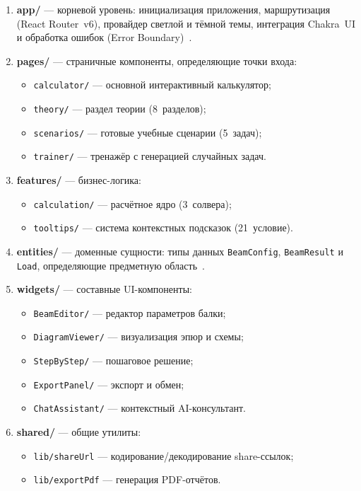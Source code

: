 \begin{enumerate}
  \item \textbf{app/} --- корневой уровень: инициализация приложения, маршрутизация (React Router~v6), провайдер светлой и тёмной темы, интеграция Chakra~UI и обработка ошибок (Error Boundary)~\cite{banks2020}.

  \item \textbf{pages/} --- страничные компоненты, определяющие точки входа:
  \begin{itemize}
    \item \texttt{calculator/} --- основной интерактивный калькулятор;
    \item \texttt{theory/} --- раздел теории (8~разделов);
    \item \texttt{scenarios/} --- готовые учебные сценарии (5~задач);
    \item \texttt{trainer/} --- тренажёр с генерацией случайных задач.
  \end{itemize}

  \item \textbf{features/} --- бизнес-логика:
  \begin{itemize}
    \item \texttt{calculation/} --- расчётное ядро (3~солвера);
    \item \texttt{tooltips/} --- система контекстных подсказок (21~условие).
  \end{itemize}

  \item \textbf{entities/} --- доменные сущности: типы данных \texttt{BeamConfig}, \texttt{BeamResult} и \texttt{Load}, определяющие предметную область~\cite{martin2017}.

  \item \textbf{widgets/} --- составные UI-компоненты:
  \begin{itemize}
    \item \texttt{BeamEditor/} --- редактор параметров балки;
    \item \texttt{DiagramViewer/} --- визуализация эпюр и схемы;
    \item \texttt{StepByStep/} --- пошаговое решение;
    \item \texttt{ExportPanel/} --- экспорт и обмен;
    \item \texttt{ChatAssistant/} --- контекстный AI-консультант.
  \end{itemize}

  \item \textbf{shared/} --- общие утилиты:
  \begin{itemize}
    \item \texttt{lib/shareUrl} --- кодирование/декодирование share-ссылок;
    \item \texttt{lib/exportPdf} --- генерация PDF-отчётов.
  \end{itemize}
\end{enumerate}

